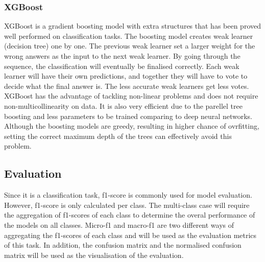 \documentclass[10pt, a4paper, twocolumn]{article} %
\begin{document}
\subsubsection{XGBoost}
XGBoost is a gradient boosting model with extra structures that has been proved well performed on classification tasks. 
The boosting model creates weak learner (decision tree) one by one. The previous weak learner set a larger weight for the wrong answers 
as the input to the next weak learner. By going through the sequence, the classification will eventually be finalised correctly. 
Each weak learner will have their own predictions, and together they will have to vote to decide what the final answer is. The less 
accurate weak learners get less votes.\\[10pt]
XGBoost has the advantage of tackling non-linear problems and does not require non-multicollinearity on data. It is also very efficient 
due to the parellel tree boosting and less parameters to be trained comparing to deep neural networks. Although the boosting models are 
greedy, resulting in higher chance of ovrfitting, setting the correct maximum depth of the trees can effectively avoid this problem.
\subsection{Evaluation}
Since it is a classification task, f1-score is commonly used for model evaluation. However, f1-score is only calculated per class. 
The multi-class case will require the aggregation of f1-scores of each class to determine the overal performance of the models on 
all classes. Micro-f1 and macro-f1 are two different ways of aggregating the f1-scores of each class and will be used as the 
evaluation metrics of this task. In addition, the confusion matrix and the normalised confusion matrix will be used as the visualisation 
of the evaluation.
\end{document}
